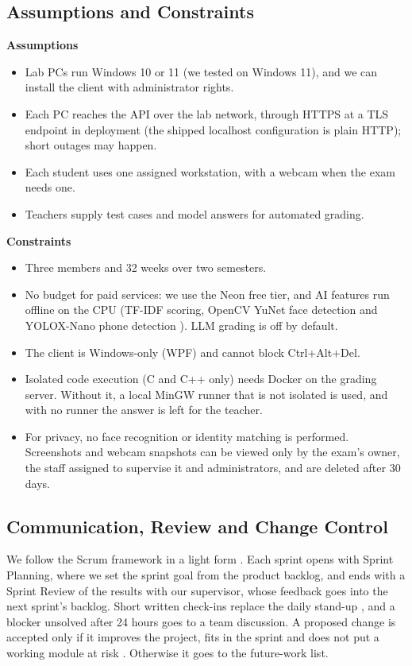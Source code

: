 \subsection{Assumptions and Constraints}
\label{sec:constraints}

\textbf{Assumptions}
\begin{itemize}
    \item Lab PCs run Windows 10 or 11 (we tested on Windows 11), and we can install the client with administrator rights.
    \item Each PC reaches the API over the lab network, through HTTPS at a TLS endpoint in deployment (the shipped localhost configuration is plain HTTP); short outages may happen.
    \item Each student uses one assigned workstation, with a webcam when the exam needs one.
    \item Teachers supply test cases and model answers for automated grading.
\end{itemize}

\textbf{Constraints}
\begin{itemize}
    \item Three members and 32 weeks over two semesters.
    \item No budget for paid services: we use the Neon free tier, and AI features run offline on the CPU (TF-IDF scoring, OpenCV YuNet face detection \cite{yunet} and YOLOX-Nano phone detection \cite{yolox}). LLM grading is off by default.
    \item The client is Windows-only (WPF) and cannot block Ctrl+Alt+Del.
    \item Isolated code execution (C and C++ only) needs Docker on the grading server. Without it, a local MinGW runner that is not isolated is used, and with no runner the answer is left for the teacher.
    \item For privacy, no face recognition or identity matching is performed. Screenshots and webcam snapshots can be viewed only by the exam's owner, the staff assigned to supervise it and administrators, and are deleted after 30 days.
\end{itemize}

\subsection{Communication, Review and Change Control}

We follow the Scrum framework in a light form \cite{scrumguide2020}. Each sprint opens with Sprint Planning, where we set the sprint goal from the product backlog, and ends with a Sprint Review of the results with our supervisor, whose feedback goes into the next sprint's backlog. Short written check-ins replace the daily stand-up \cite{scrum1}, and a blocker unsolved after 24 hours goes to a team discussion. A proposed change is accepted only if it improves the project, fits in the sprint and does not put a working module at risk \cite[Sec.~4.6]{pmbok6}. Otherwise it goes to the future-work list.

